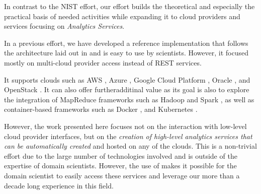 
In contrast to the NIST effort, our effort builds the theoretical and
especially the practical basis of needed activities while expanding it
to cloud providers and services focusing on {\em Analytics Services}.

In a previous effort, we have developed a reference implementation
that follows the architecture laid out in  and is easy
to use by scientists.  However, it focused mostly on multi-cloud
provider access instead of REST services. 

It supports clouds such as
AWS \cite{www-aws}, Azure \cite{www-azure}, Google Cloud
Platform \cite{www-google}, Oracle \cite{www-oracle-cloud}, and
OpenStack \cite{www-openStack}. It can also offer furtheradditinal value as its goal is also to 
explore the integration of
MapReduce frameworks such as
Hadoop \cite{www-hadoop} and Spark \cite{www-spark}, as well as
container-based frameworks such as Docker \cite{www-docker}, and
Kubernetes \cite{www-kubernetes}.

However, the work presented here focuses not on the interaction with low-level
cloud provider interfaces, but on the {\em creation of high-level analytics services
that can be automatically created} and hosted on any of the
clouds.  This is a non-trivial
effort due to the large number of technologies involved and is outside
of the expertise of domain scientists. However, the use of \Cloudmesh
makes it possible for the domain scientist to easily access these
services and leverage our more than a decade long experience in this
field.


